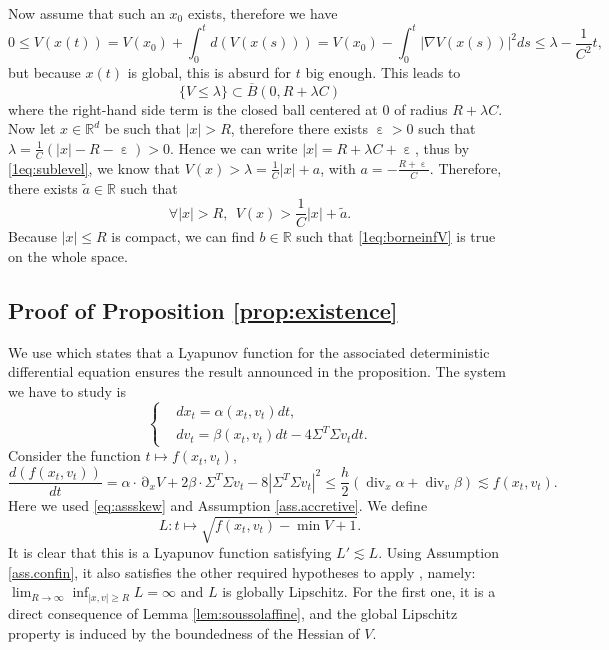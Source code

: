 \documentclass[12pt]{amsart}
\newcommand{\R}{\mathbb R}
\renewcommand{\div}{\operatorname{div}}
\numberwithin{equation}{section}
\numberwithin{figure}{section}
\DeclareMathOperator{\p}{\partial}
\DeclareMathOperator{\eps}{\varepsilon}
\begin{document}
Now assume that such an $x_0$ exists, therefore we have
\begin{equation*}
0\leq V(x(t)) = V(x_0) + \int_0^td(V(x(s))) = V(x_0) - \int_0^t|\nabla V(x(s))|^2ds \leq \lambda - \frac1{C^2}t,
\end{equation*}
but because $x(t)$ is global, this is absurd for $t$ big enough. This leads to
\begin{equation}\label{1eq:sublevel}
\{V\leq\lambda\}\subset \overline B(0,R+\lambda C)
\end{equation}
where the right-hand side term is the closed ball centered at $0$ of radius $R+\lambda C$. Now let $x\in\R^d$ be such that $|x| > R$, therefore there exists $\eps>0$ such that $\lambda = \frac1C(|x| - R - \eps) > 0$. Hence we can write $|x| = R + \lambda C + \eps$, thus by \eqref{1eq:sublevel}, we know that $V(x) > \lambda = \frac1C|x| + a$, with $a = -\frac{R+\eps}{C}$. Therefore, there exists $\tilde a\in\R$ such that
\begin{equation}\label{1eq:borneinfV}
\forall |x| > R,\ \ V(x) > \frac1C|x| + \tilde a.
\end{equation}
Because $|x|\leq R$ is compact, we can find $b\in\R$ such that \eqref{1eq:borneinfV} is true on the whole space.










\subsection{Proof of Proposition \ref{prop:existence}}\label{ssec:existence}

We use \cite[Theorem 1.7]{Kh12} which states that a Lyapunov function for the associated deterministic differential equation ensures the result announced in the proposition. The system we have to study is
\begin{equation*}
\left\{
\begin{aligned}
&dx_t = \alpha(x_t,v_t)dt,\\
&dv_t = \beta(x_t,v_t)dt - 4\Sigma^T\Sigma v_tdt.
\end{aligned}
\right.
\end{equation*}
Consider the function $t\mapsto f(x_t,v_t)$,
\begin{equation*}
\frac{d(f(x_t,v_t))}{dt} = \alpha\cdot\p_xV + 2\beta\cdot\Sigma^T\Sigma v_t - 8|\Sigma^T\Sigma v_t|^2 \leq \frac h2 (\div_x\alpha + \div_v\beta) \lesssim f(x_t,v_t).
\end{equation*}
Here we used \eqref{eq:assskew} and Assumption \ref{ass.accretive}. We define
\begin{equation*}
L:t\mapsto\sqrt{f(x_t,v_t) - \min V + 1}.
\end{equation*}
It is clear that this is a Lyapunov function satisfying $L' \lesssim L$. Using Assumption \ref{ass.confin}, it also satisfies the other required hypotheses to apply \cite[Theorem 1.7]{Kh12}, namely: $\lim_{R\to\infty}\inf_{|x,v|\geq R}L = \infty$ and $L$ is globally Lipschitz. For the first one, it is a direct consequence of Lemma \ref{lem:soussolaffine}, and the global Lipschitz property is induced by the boundedness of the Hessian of $V$.
\end{document}
